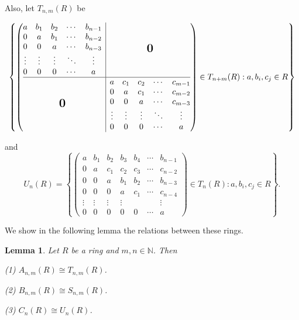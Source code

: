 \documentclass[12pt]{amsart}
\newtheorem{lemma}[theorem]{Lemma}
\theoremstyle{definition}
\newcommand{\bigzero}{\mbox{\normalfont\Large\bfseries 0}}
\begin{document}
Also, let $T_{n,m}(R)$ be 

$$\left\{ \left(\begin{array}{@{}c|c@{}}
  \begin{matrix}
  a & b_1 & b_2 & \cdots & b_{n-1} \\
  0 & a & b_1 & \cdots & b_{n-2} \\
  0 & 0 & a & \cdots & b_{n-3} \\
  \vdots & \vdots & \vdots & \ddots & \vdots \\
  0 & 0 & 0 & \cdots & a
  \end{matrix}
  & \bigzero \\
\hline
  \bigzero &
  \begin{matrix}
  a & c_1 & c_2 & \cdots & c_{m-1} \\
  0 & a & c_1 & \cdots & c_{m-2} \\
  0 & 0 & a & \cdots & c_{m-3} \\
  \vdots & \vdots & \vdots & \ddots & \vdots \\
  0 & 0 & 0 & \cdots & a
  \end{matrix}
\end{array}\right)\in T_{n+m}(R) : a, b_i,c_j \in R \right\} $$

and 
$$U_{n}(R)=\left\{ \begin{pmatrix}
   a & b_1 & b_2 & b_3 & b_4 & \cdots & b_{n-1} \\ 
   0 & a & c_1 & c_2 & c_3 & \cdots & c_{n-2} \\ 
   0 & 0 & a & b_1 & b_2 & \cdots & b_{n-3} \\
   0 & 0 & 0 & a & c_1 & \cdots & c_{n-4} \\ 
   \vdots & \vdots & \vdots & \vdots &  &  & \vdots \\
   0 &0 & 0 & 0 & 0 & \cdots & a
\end{pmatrix}\in T_{n}(R) :  a, b_i, c_j \in R \right\}.$$

We show in the following lemma the relations between these rings.
 
\begin{lemma} \label{section 3 lemma}
    Let $R$ be a ring and $m, n \in \mathbb{N}$. Then
    
(1) $A_{n,m}(R) \cong T_{n,m}(R)$.

(2) $B_{n,m}(R) \cong S_{n,m}(R)$.

(3) $C_{n}(R) \cong U_{n}(R)$.
\end{lemma}
\end{document}
